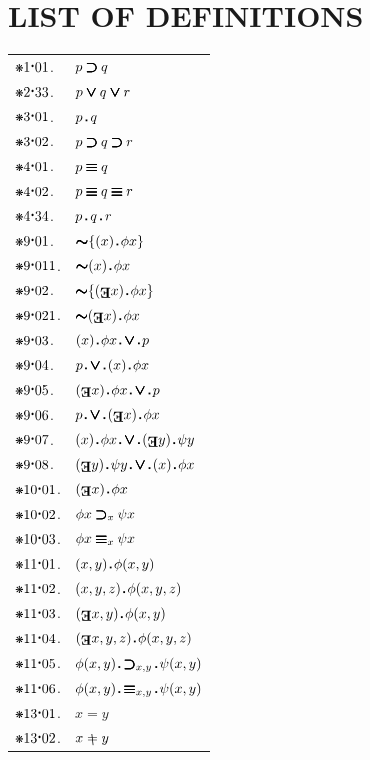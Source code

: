 \documentclass[12pt,openany,leqno,twocolumn]{book}
\newcommand{\pmast}{\text{\resizebox{!}{.75\height}{\ding{107}}}} %
\newcommand{\pmcdot}{\text{\raisebox{.05cm}{$\boldsymbol\cdot$}}} %
\newcommand{\pmd}{\hbox{\rule{.3ex}{.3ex}}} %
\newcommand{\pmdot}{\mathinner{\pmd}}
\newcommand{\pmnot}{\mathord{\ooalign{$\boldsymbol{\sim}\mkern.5mu$\hidewidth\cr$\boldsymbol{\sim}$\cr\hidewidth$\mkern.5mu\boldsymbol{\sim}$}}}
\newcommand{\pmor}{\mathbin{\ooalign{$\boldsymbol{\vee}\mkern.5mu$\hidewidth\cr$\boldsymbol{\vee}$\cr\hidewidth$\mkern.5mu\boldsymbol{\vee}$}}}
\newcommand{\pmimp}{\mathbin{\ooalign{$\boldsymbol{\supset}\mkern.5mu$\hidewidth\cr$\boldsymbol{\supset}$\cr\hidewidth$\mkern.5mu\boldsymbol{\supset}$}}} %
\newcommand{\pmand}{\mathbin{\pmd}}%
\newcommand{\pmiff}{\mathbin{\ooalign{$\boldsymbol{\equiv}\mkern.5mu$\hidewidth\cr$\boldsymbol{\equiv}$\cr\hidewidth$\mkern.5mu\boldsymbol{\equiv}$}}} %
\newcommand{\pmall}[1]{(#1)}
\newcommand{\pmsome}[1]{(\text{\raisebox{.5em}{\rotatebox{180}{\textbf{E}}}}#1)} %
\newcommand{\pmnid}{\mathrel{\ooalign{$=$\cr\hidewidth\footnotesize\rotatebox[origin=c]{210}{\textbf{/}}\hidewidth\cr}}} %
\begin{document}
	
\chapter*{\centering LIST OF DEFINITIONS}
\onehalfspacing
\begin{tabular}{l l}
	\text{ }$\pmast1\pmcdot01$. & $p \pmimp q$ \\
	\text{ }$\pmast2\pmcdot33$. & $p \pmor q \pmor r$ \\
	\text{ }$\pmast3\pmcdot01$. & $p \pmand q$ \\
	\text{ }$\pmast3\pmcdot02$. & $p \pmimp q \pmimp r$ \\
	\text{ }$\pmast4\pmcdot01$. & $p \pmiff q$ \\
	\text{ }$\pmast4\pmcdot02$. & $p \pmiff q \pmiff r$ \\
	\text{ }$\pmast4\pmcdot34$. & $p \pmand q \pmand r$ \\
	\text{ }$\pmast9\pmcdot01$. & $\pmnot\{\pmall{x}\pmdot \phi x\}$ \\
	\text{ }$\pmast9\pmcdot011$. & $\pmnot\pmall{x}\pmdot \phi x$ \\
	\text{ }$\pmast9\pmcdot02$. & $\pmnot\{\pmsome{x}\pmdot \phi x\}$ \\
	\text{ }$\pmast9\pmcdot021$. & $\pmnot\pmsome{x}\pmdot \phi x$ \\
	\text{ }$\pmast9\pmcdot03$. & $\pmall{x}\pmdot \phi x \pmdot \pmor \pmdot p$ \\
	\text{ }$\pmast9\pmcdot04$. & $p \pmdot \pmor \pmdot \pmall{x}\pmdot \phi x$ \\
	\text{ }$\pmast9\pmcdot05$. & $\pmsome{x}\pmdot \phi x \pmdot \pmor \pmdot p$ \\
	\text{ }$\pmast9\pmcdot06$. & $p \pmdot \pmor \pmdot \pmsome{x}\pmdot \phi x$ \\
	\text{ }$\pmast9\pmcdot07$. & $\pmall{x}\pmdot \phi x \pmdot \pmor \pmdot \pmsome{y}\pmdot \psi y$ \\
	\text{ }$\pmast9\pmcdot08$. & $\pmsome{y}\pmdot \psi y \pmdot \pmor \pmdot \pmall{x}\pmdot \phi x$ \\
	$\pmast10\pmcdot01$. & $\pmsome{x}\pmdot \phi x$ \\
	$\pmast10\pmcdot02$. & $\phi x \pmimp_x \psi x$ \\
	$\pmast10\pmcdot03$. & $\phi x \pmiff_x \psi x$ \\
	$\pmast11\pmcdot01$. & $\pmall{x,y}\pmdot \phi(x, y)$ \\
	$\pmast11\pmcdot02$. & $\pmall{x,y,z}\pmdot \phi(x, y, z)$ \\
	$\pmast11\pmcdot03$. & $\pmsome{x,y}\pmdot \phi(x, y)$ \\
	$\pmast11\pmcdot04$. & $\pmsome{x,y,z}\pmdot \phi(x, y, z)$ \\
	$\pmast11\pmcdot05$. & $\phi(x, y) \pmdot\pmimp_{x, y}\pmdot \psi(x, y)$ \\
	$\pmast11\pmcdot06$. & $\phi(x, y) \pmdot\pmiff_{x, y}\pmdot \psi(x, y)$ \\
	$\pmast13\pmcdot01$. & $x = y$ \\
	$\pmast13\pmcdot02$. & $x \pmnid y$ 
\end{tabular}
\end{document}
